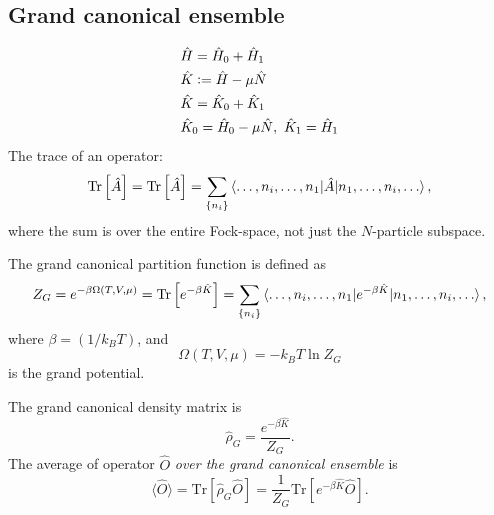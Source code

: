 \documentclass[11pt, a4paper]{article}
\newcommand{\Tr}[1]{\mathrm{Tr}\left[#1\right]}
\begin{document}
\subsection{Grand canonical ensemble}
\begin{align*}
    &\hat H = \hat H_0 + \hat H_1\\
    &\hat K \vcentcolon= \hat H - \mu \hat N\\
    &\hat K = \hat K_0 + \hat K_1\\
    &\hat K_0 = \hat H_0 - \mu \hat N, ~ \hat K_1 = \hat H_1
\end{align*}
The trace of an operator:
\begin{equation*}
    \Tr{\hat A} = \Tr{\hat A} = \sum\limits_{\{n_i\}}\braket{\dots, n_i, \dots, n_1 | \hat A |n_1, \dots, n_i, \dots},
\end{equation*}
where the sum is over the entire Fock-space, not just the $N$-particle subspace.
\par The grand canonical partition function is defined as 
\begin{equation*}
    Z_G = e^{-\beta\Omega(T,V,\mu)} = \Tr{e^{-\beta\hat K}} = 
    \sum\limits_{\{n_i\}}\braket{\dots, n_i, \dots, n_1 | e^{-\beta\hat K} |n_1, \dots, n_i, \dots},
\end{equation*}
where $\beta = (1/k_BT)$, and 
\begin{equation*}
    \Omega(T, V, \mu) = -k_BT\ln Z_G
\end{equation*}
is the grand potential.
\par The grand canonical density matrix is 
\begin{equation*}
    \hat\rho_G = \frac{e^{-\beta\hat K}}{Z_G}.
\end{equation*}
The average of operator $\hat O$ \textit{over the grand canonical ensemble} is
\begin{equation*}
    \langle \hat O \rangle = \Tr{\hat \rho_G \hat O} = \frac{1}{Z_G}\Tr{e^{-\beta \hat K}\hat O}.
\end{equation*}
\end{document}
